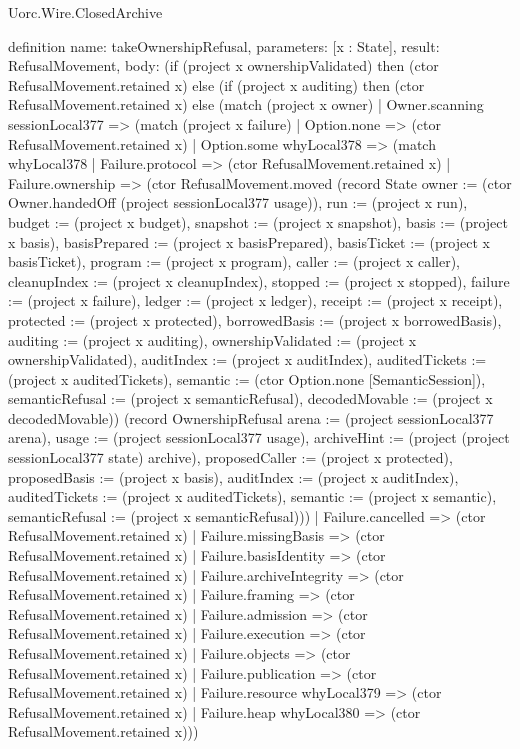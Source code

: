 \begin{lexlean}{Uorc.Wire.ClosedArchive}
\begin{semanticmodule}
definition{
  name: takeOwnershipRefusal,
  parameters: [x : State],
  result: RefusalMovement,
  body: (if (project x ownershipValidated) then (ctor RefusalMovement.retained x) else (if (project x auditing) then (ctor RefusalMovement.retained x) else (match (project x owner)
    | Owner.scanning sessionLocal377 => (match (project x failure)
      | Option.none => (ctor RefusalMovement.retained x)
      | Option.some whyLocal378 => (match whyLocal378
        | Failure.protocol => (ctor RefusalMovement.retained x)
        | Failure.ownership => (ctor RefusalMovement.moved (record State {owner := (ctor Owner.handedOff (project sessionLocal377 usage)), run := (project x run), budget := (project x budget), snapshot := (project x snapshot), basis := (project x basis), basisPrepared := (project x basisPrepared), basisTicket := (project x basisTicket), program := (project x program), caller := (project x caller), cleanupIndex := (project x cleanupIndex), stopped := (project x stopped), failure := (project x failure), ledger := (project x ledger), receipt := (project x receipt), protected := (project x protected), borrowedBasis := (project x borrowedBasis), auditing := (project x auditing), ownershipValidated := (project x ownershipValidated), auditIndex := (project x auditIndex), auditedTickets := (project x auditedTickets), semantic := (ctor Option.none [SemanticSession]), semanticRefusal := (project x semanticRefusal), decodedMovable := (project x decodedMovable)}) (record OwnershipRefusal {arena := (project sessionLocal377 arena), usage := (project sessionLocal377 usage), archiveHint := (project (project sessionLocal377 state) archive), proposedCaller := (project x protected), proposedBasis := (project x basis), auditIndex := (project x auditIndex), auditedTickets := (project x auditedTickets), semantic := (project x semantic), semanticRefusal := (project x semanticRefusal)}))
        | Failure.cancelled => (ctor RefusalMovement.retained x)
        | Failure.missingBasis => (ctor RefusalMovement.retained x)
        | Failure.basisIdentity => (ctor RefusalMovement.retained x)
        | Failure.archiveIntegrity => (ctor RefusalMovement.retained x)
        | Failure.framing => (ctor RefusalMovement.retained x)
        | Failure.admission => (ctor RefusalMovement.retained x)
        | Failure.execution => (ctor RefusalMovement.retained x)
        | Failure.objects => (ctor RefusalMovement.retained x)
        | Failure.publication => (ctor RefusalMovement.retained x)
        | Failure.resource whyLocal379 => (ctor RefusalMovement.retained x)
        | Failure.heap whyLocal380 => (ctor RefusalMovement.retained x)))
}
\end{semanticmodule}
\end{lexlean}
